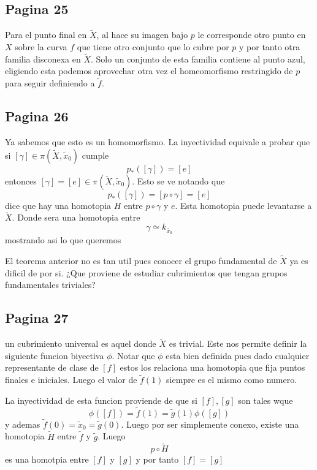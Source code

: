 \documentclass[letterpaper]{article}
\begin{document}
\subsection*{Pagina 25}
Para el punto final en \(\tilde X\), al hace su imagen bajo \(p\) le
corresponde otro punto en \(X\) sobre la curva \(f\) que tiene otro
conjunto que lo cubre por \(p\) y por tanto otra familia disconexa en
\(\tilde X\). Solo un conjunto de esta familia contiene al punto azul,
eligiendo esta podemos aprovechar otra vez el homeomorfismo restringido
de \(p\) para seguir definiendo a \(\tilde f\).

\subsection*{Pagina 26}
Ya sabemos que esto es un homomorfismo. La inyectividad equivale a
probar que si \([\gamma] \in \pi (\tilde X, \tilde x_0)\) cumple
\[ p_* ([\gamma]) = [e]\]
entonces \([\gamma] = [e] \in \pi (\tilde X, \tilde x_0)\). Esto se ve
notando que
\[ p_* ([\gamma]) = [p \circ \gamma] = [e]\]
dice que hay una homotopia \(H\) entre \(p \circ \gamma\) y \(e\). Esta
homotopia puede levantarse a \(\tilde X\). Donde sera una homotopia
entre
\[ \gamma \simeq k_{\tilde {x_0}} \]
mostrando asi lo que queremos

El teorema anterior no es tan util pues conocer el grupo fundamental de
\(\tilde X\) ya es dificil de por si. ¿Que proviene de estudiar
cubrimientos que tengan grupos fundamentales triviales?

\subsection*{Pagina 27}
un cubrimiento universal es aquel donde \(\tilde X\) es trivial. Este
nos permite definir la siguiente funcion biyectiva \(\phi\). Notar que
\(\phi\) esta bien definida pues dado cualquier representante de clase
de \([f]\) estos los relaciona una homotopia que fija puntos finales e
iniciales. Luego el valor de \(\tilde f (1)\) siempre es el mismo como
numero.

La inyectividad de esta funcion proviende de que si \([f] , [g]\) son
tales wque
\[ \phi ([f]) = \tilde f (1) = \tilde g (1) \phi ([g]) \]
y ademas \(\tilde f (0) = \tilde x_0 = \tilde g (0)\). Luego por ser
simplemente conexo, existe una homotopia \(\tilde H\) entre \(\tilde f\)
y \(\tilde g\). Luego
\[ p \circ \tilde H \]
es una homotpia entre \([f]\) y \([g]\) y por tanto \([f] = [g] \)
\end{document}
